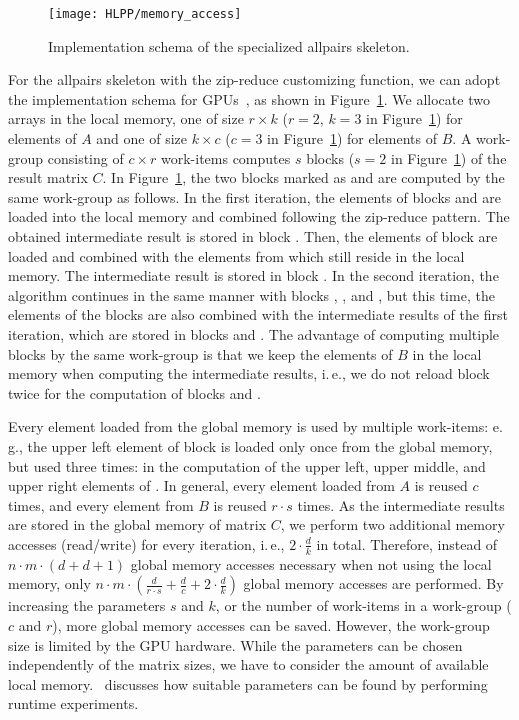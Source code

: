 \begin{figure}[b]
  \centering
  \texttt{[image: HLPP/memory\_access]}
  \caption{Implementation schema of the specialized allpairs skeleton.}
  \label{fig:memory_access}
\end{figure}
For the allpairs skeleton with the zip-reduce customizing function, we can adopt the implementation schema for GPUs~\cite{SaA-13}, as shown in Figure~\ref{fig:memory_access}.
We allocate two arrays in the local memory, one of size $r\times k$ ($r=2$, $k=3$ in Figure~\ref{fig:memory_access}) for elements of $A$ and one of size $k\times c$ ($c=3$ in Figure~\ref{fig:memory_access}) for elements of $B$.
A work-group consisting of $c\times r$ work-items computes $s$ blocks ($s=2$ in Figure~\ref{fig:memory_access}) of the result matrix $C$.
In Figure~\ref{fig:memory_access}, the two blocks marked as  and  are computed by the same work-group as follows.
In the first iteration, the elements of blocks  and  are loaded into the local memory and combined following the zip-reduce pattern.
The obtained intermediate result is stored in block .
Then, the elements of block  are loaded and combined with the elements from  which still reside in the local memory.
The intermediate result is stored in block .
In the second iteration, the algorithm continues in the same manner with blocks , , and , but this time, the elements of the blocks are also combined with the intermediate results of the first iteration, which are stored in blocks  and .
The advantage of computing multiple blocks by the same work-group is that we keep the elements of $B$ in the local memory when computing the intermediate results, i.\,e., we do not reload block  twice for the computation of blocks  and .

Every element loaded from the global memory is used by multiple work-items:
e.\,g., the upper left element of block  is loaded only once from the global memory, but used three times:
in the computation of the upper left, upper middle, and upper right elements of .
In general, every element loaded from $A$ is reused $c$ times, and every element from $B$ is reused $r\cdot s$ times.
As the intermediate results are stored in the global memory of matrix $C$, we perform two additional memory accesses (read/write) for every iteration, i.\,e., $2\cdot \frac{d}{k}$ in total.
Therefore, instead of $n\cdot m\cdot (d + d + 1)$ global memory accesses necessary when not using the local memory, only $n\cdot m\cdot (\frac{d}{r\cdot s} + \frac{d}{c} + 2\cdot \frac{d}{k})$ global memory accesses are performed.
By increasing the parameters $s$ and $k$, or the number of work-items in a work-group ($c$ and $r$), more global memory accesses can be saved.
However, the work-group size is limited by the GPU hardware.
While the parameters can be chosen independently of the matrix sizes, we have to consider the amount of available local memory.
\cite{SaA-13}~discusses how suitable parameters can be found by performing runtime experiments.

